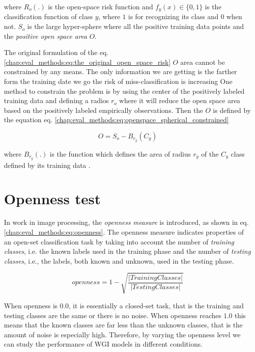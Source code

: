 \noindent
where $R_{o}(.)$ is the open-space risk function and $f_{y}(x)  \in \{0, 1\}$ is the classification function of class $y$, where $1$ is for recognizing its class and $0$ when not. $S_{o}$ is the large hyper-sphere where all the positive training data points and the \textit{positive open space area} $O$. 

The original formulation of the eq. \ref{chap:eval_methods:eq:the_original_open_space_risk} $O$ area cannot be constrained by any means. The only information we are getting is the farther form the training date we go the risk of miss-classification is increasing One method to constrain the problem is by using the center of the positively labeled training data and defining a radios $r_{o}$ where it will reduce the open space area based on the positively labeled empirically observations. Then the $O$ is defined by the equation eq. \ref{chap:eval_methods:eq:openspace_spherical_constrained}

\begin{equation}\label{chap:eval_methods:eq:openspace_spherical_constrained}
	O = S_{o} - B_{r_{y}}(C_{y})
\end{equation}

\noindent
where $B_{r_{y}}(.)$ is the function which defines the area of radius $r_{y}$ of the $C_{y}$ class defined by its training data \parencite{fei2016breaking}.

\section{Openness test}\label{chap:eval_methods:sec:open_space_risk}

In \parencite{scheirer2013toward} work in image processing, the \textit{openness measure} is introduced, as shown in eq. \ref{chap:eval_methods:eq:openness}. The openness measure indicates properties of an open-set classification task by taking into account the number of \textit{training classes}, i.e. the known labels used in the training phase and the number of \textit{testing classes}, i.e., the labels, both known and unknown, used in the testing phase.

\begin{equation}\label{chap:eval_methods:eq:openness}
	openness=1-\sqrt{\frac{ | Training Classes | }{ |Testing Classes | }}
\end{equation}

When openness is $0.0$, it is essentially a closed-set task, that is the training and testing classes are the same or there is no noise. When openness reaches $1.0$ this means that the known classes are far less than the unknown classes, that is the amount of noise is especially high. Therefore, by varying the openness level we can study the performance of WGI models in different conditions.

